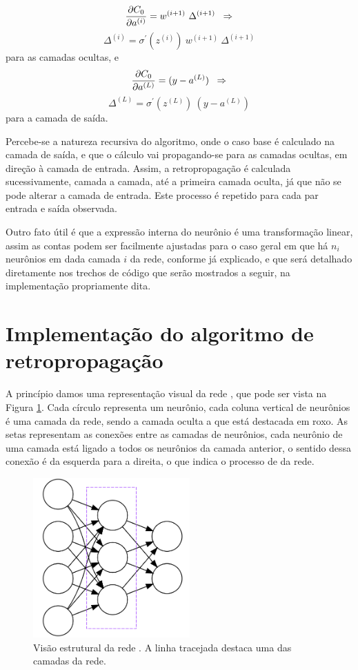 \[ \dfrac{\partial C_0}{\partial a^{(i)}} = w^{(i+1)}~ \Delta^{(i+1)}  \;\;\Rightarrow \]
\begin{equation}\label{retro:15}
\Delta^{(i)} = \sigma^{'}(z^{(i)})~ w^{(i+1)}~ \Delta^{(i+1)}
\end{equation}
para as camadas ocultas, e
\[ \dfrac{\partial C_0}{\partial a^{(L)}} = (y - a^{(L)}) \;\;\Rightarrow \]
\begin{equation}\label{retro:16}
\Delta^{(L)} = \sigma^{'}(z^{(L)})~ (y - a^{(L)})
\end{equation}
para a camada de saída.

Percebe-se a natureza recursiva do algoritmo, onde o caso base é calculado na camada de saída, e que o cálculo vai propagando-se para as camadas ocultas, em direção à camada de entrada. Assim, a retropropagação é calculada sucessivamente, camada a camada, até a primeira camada oculta, já que não se pode alterar a camada de entrada. Este processo é repetido para cada par entrada e saída observada.

Outro fato útil é que a expressão interna do neurônio é uma transformação linear, assim as contas podem ser facilmente ajustadas para o caso geral em que há $n_i$ neurônios em dada camada $i$ da rede, conforme já explicado, e que será detalhado diretamente nos trechos de código que serão mostrados a seguir, na implementação propriamente dita.

\section{Implementação do algoritmo de retropropagação}

A princípio damos uma representação visual da rede , que pode ser vista na Figura \ref{fig:estrutura_rn}. Cada círculo representa um neurônio, cada coluna vertical de neurônios é uma camada da rede, sendo a camada oculta a que está destacada em roxo. As setas representam as conexões entre as camadas de neurônios, cada neurônio de uma camada está ligado a todos os neurônios da camada anterior, o sentido dessa conexão é da esquerda para a direita, o que indica o processo de  da rede.

\begin{figure}[htb]
\centering
\includegraphics[width=6cm]{figuras/estrutura_rn}
\caption{Visão estrutural da rede . A linha tracejada destaca uma das camadas da rede.}
\label{fig:estrutura_rn}
\end{figure}

